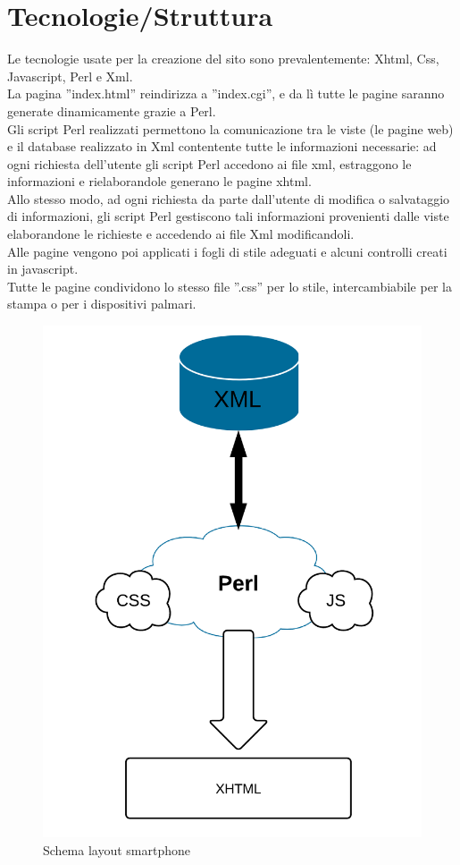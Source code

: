 \section{Tecnologie/Struttura }
Le tecnologie usate per la creazione del sito sono prevalentemente: Xhtml, Css, Javascript, Perl e Xml. \\
La pagina ''index.html'' reindirizza a ''index.cgi'', e da lì tutte le pagine saranno generate dinamicamente grazie a Perl.\\
Gli script Perl realizzati permettono la comunicazione tra le viste (le pagine web) e il database realizzato in Xml contentente tutte le informazioni necessarie: ad ogni richiesta dell'utente gli script Perl accedono ai file xml, estraggono le informazioni e rielaborandole generano le pagine xhtml.\\
Allo stesso modo, ad ogni richiesta da parte dall'utente di modifica o salvataggio di informazioni, gli script Perl gestiscono tali informazioni provenienti dalle viste elaborandone le richieste e accedendo ai file Xml modificandoli.\\
Alle pagine vengono poi applicati i fogli di stile adeguati e alcuni controlli creati in javascript.\\
Tutte le pagine condividono lo stesso file ''.css'' per lo stile, intercambiabile per la stampa o per i dispositivi palmari.

\begin{center}
\begin{figure}[H]
\centering
\includegraphics[scale=0.55]{images/struttura.png}
\caption{Schema layout smartphone}
\end{figure}
\end{center}


